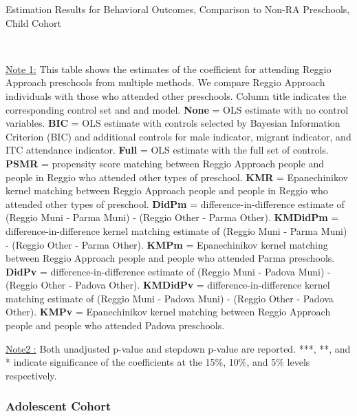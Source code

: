 \begin{table}[H] \caption{Estimation Results for Behavioral Outcomes, Comparison to Non-RA Preschools, Child Cohort} \label{ols-B-child-reg-reli}
\scalebox{0.59}{}
\vspace{1ex} \\
{\footnotesize\raggedright{\underline{Note 1:} This table shows the estimates of the coefficient for attending Reggio Approach preschools from multiple methods. We compare Reggio Approach individuals with those who attended other preschools. Column title indicates the corresponding control set and and model. \textbf{None} = OLS estimate with no control variables. \textbf{BIC} = OLS estimate with controls selected by Bayesian Information Criterion (BIC) and additional controls for male indicator, migrant indicator, and ITC attendance indicator. \textbf{Full} = OLS estimate with the full set of controls. \textbf{PSMR} =  propensity score matching between Reggio Approach people and people in Reggio who attended other types of preschool. \textbf{KMR} = Epanechinikov kernel matching between Reggio Approach people and people in Reggio who attended other types of preschool. \textbf{DidPm} = difference-in-difference estimate of (Reggio Muni - Parma Muni) - (Reggio Other - Parma Other). \textbf{KMDidPm} = difference-in-difference kernel matching estimate of (Reggio Muni - Parma Muni) - (Reggio Other - Parma Other).   \textbf{KMPm} = Epanechinikov kernel matching between Reggio Approach people and people who attended Parma preschools. \textbf{DidPv} = difference-in-difference estimate of (Reggio Muni - Padova Muni) - (Reggio Other - Padova Other). \textbf{KMDidPv} = difference-in-difference kernel matching estimate of (Reggio Muni - Padova Muni) - (Reggio Other - Padova Other).  \textbf{KMPv} = Epanechinikov kernel matching between Reggio Approach people and people who attended Padova preschools.}

\footnotesize\raggedright{\underline{Note2 :} Both unadjusted p-value and stepdown p-value are reported. ***, **, and * indicate significance of the coefficients at the 15\%, 10\%, and 5\% levels respectively.}\\}
\end{table}

\subsubsection{Adolescent Cohort}

